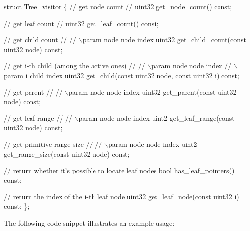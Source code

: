 \begin{DoxyCode}
\textcolor{keyword}{struct }Tree\_visitor
\{
    \textcolor{comment}{// get node count}
    \textcolor{comment}{//}
    uint32 get\_node\_count() \textcolor{keyword}{const};

    \textcolor{comment}{// get leaf count}
    \textcolor{comment}{//}
    uint32 get\_leaf\_count() \textcolor{keyword}{const};

    \textcolor{comment}{// get child count}
    \textcolor{comment}{//}
    \textcolor{comment}{// \(\backslash\)param node    node index}
    uint32 get\_child\_count(\textcolor{keyword}{const} uint32 node) \textcolor{keyword}{const};

    \textcolor{comment}{// get i-th child (among the active ones)}
    \textcolor{comment}{//}
    \textcolor{comment}{// \(\backslash\)param node    node index}
    \textcolor{comment}{// \(\backslash\)param i        child index}
    uint32 get\_child(\textcolor{keyword}{const} uint32 node, \textcolor{keyword}{const} uint32 i) \textcolor{keyword}{const};

    \textcolor{comment}{// get parent}
    \textcolor{comment}{//}
    \textcolor{comment}{// \(\backslash\)param node    node index}
    uint32 get\_parent(\textcolor{keyword}{const} uint32 node) \textcolor{keyword}{const};

    \textcolor{comment}{// get leaf range}
    \textcolor{comment}{//}
    \textcolor{comment}{// \(\backslash\)param node    node index}
    uint2 get\_leaf\_range(\textcolor{keyword}{const} uint32 node) \textcolor{keyword}{const};

    \textcolor{comment}{// get primitive range size}
    \textcolor{comment}{//}
    \textcolor{comment}{// \(\backslash\)param node    node index}
    uint2 get\_range\_size(\textcolor{keyword}{const} uint32 node) \textcolor{keyword}{const};

    \textcolor{comment}{// return whether it's possible to locate leaf nodes}
    \textcolor{keywordtype}{bool} has\_leaf\_pointers() \textcolor{keyword}{const};

    \textcolor{comment}{// return the index of the i-th leaf node}
    uint32 get\_leaf\_node(\textcolor{keyword}{const} uint32 i) \textcolor{keyword}{const};
\};
\end{DoxyCode}


The following code snippet illustrates an example usage\+:


